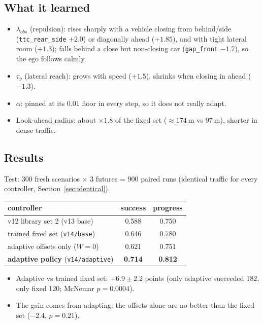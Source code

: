 \documentclass[11pt,a4paper]{article}
\begin{document}
\subsection{What it learned}
\begin{itemize}
  \item $\lambda_{obs}$ (repulsion): rises sharply with a vehicle closing from behind/side
        (\texttt{ttc\_rear\_side} $+2.0$) or diagonally ahead ($+1.85$), and with tight lateral room ($+1.3$);
        falls behind a close but non-closing car (\texttt{gap\_front} $-1.7$), so the ego follows calmly.
  \item $\tau_y$ (lateral reach): grows with speed ($+1.5$), shrinks when closing in ahead ($-1.3$).
  \item $\alpha$: pinned at its $0.01$ floor in every step, so it does not really adapt.
  \item Look-ahead radius: about $\times 1.8$ of the fixed set ($\approx 174~\mathrm{m}$ vs $97~\mathrm{m}$),
        shorter in dense traffic.
\end{itemize}

\subsection{Results}
Test: 300 fresh scenarios $\times$ 3 futures = 900 paired runs (identical traffic for every controller, Section~\ref{sec:identical}).
\begin{center}
\begin{tabular}{lcc}
  \toprule
  controller & success & progress \\
  \midrule
  v12 library set 2 (v13 base)        & 0.588 & 0.750 \\
  trained fixed set (\texttt{v14/base}) & 0.646 & 0.780 \\
  adaptive offsets only ($W = 0$)     & 0.621 & 0.751 \\
  \textbf{adaptive policy} (\texttt{v14/adaptive}) & \textbf{0.714} & \textbf{0.812} \\
  \bottomrule
\end{tabular}
\end{center}
\begin{itemize}
  \item Adaptive vs trained fixed set: $+6.9 \pm 2.2$ points (only adaptive succeeded 182, only fixed 120;
        McNemar $p = 0.0004$).
  \item The gain comes from adapting: the offsets alone are no better than the fixed set ($-2.4$, $p = 0.21$).
\end{itemize}
\end{document}
